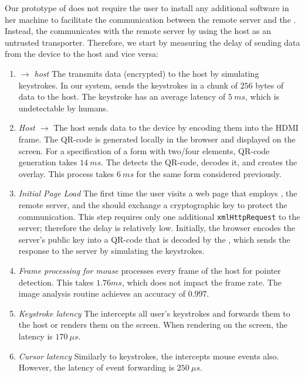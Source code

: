 Our prototype of \name does not require the user to install any additional software in her machine to facilitate the communication between the remote server and the \device. Instead, the \device communicates with the remote server by using the host as an untrusted transporter. Therefore, we start by measuring the delay of sending data from the device to the host and vice versa:

\begin{enumerate}
  \item \emph{\device $\rightarrow$ host} The \device transmits data (encrypted) to the host by simulating keystrokes. In our system, \device sends the keystrokes in a chunk of $256$ bytes of data to the host. The keystroke has an average latency of $5\ ms$, which is undetectable by humans.  


\item \emph{Host $\rightarrow$ \device} The host sends data to the device by encoding them into the HDMI frame. The QR-code is generated locally in the browser and displayed on the screen. For a specification of a form with two/four elements, QR-code generation takes $14\ ms$. The \device detects the QR-code, decodes it, and creates the overlay. This process takes $6\ ms$ for the same form considered previously.
 
 \item \emph{Initial Page Load} The first time the user visits a web page that employs \name, the remote server, and the \device should exchange a cryptographic key to protect the communication. This step requires only one additional \texttt{xmlHttpRequest} to the server; therefore the delay is relatively low. Initially, the browser encodes the server's public key into a QR-code that is decoded by the \device, which sends the response to the server by simulating the keystrokes.


\item \emph{Frame processing for mouse} \device processes every frame of the host for pointer detection. This takes $1.76 ms$, which does not impact the frame rate. The image analysis routine achieves an accuracy of $0.997$. 


\item \emph{Keystroke latency} The \device intercepts all user's keystrokes and forwards them to the host or renders them on the screen. When rendering on the screen, the latency is $170\ \mu s$.


\item \emph{Cursor latency} Similarly to keystrokes, the \device intercepts mouse events also. However, the latency of event forwarding is $250\ \mu s$.


\end{enumerate}
